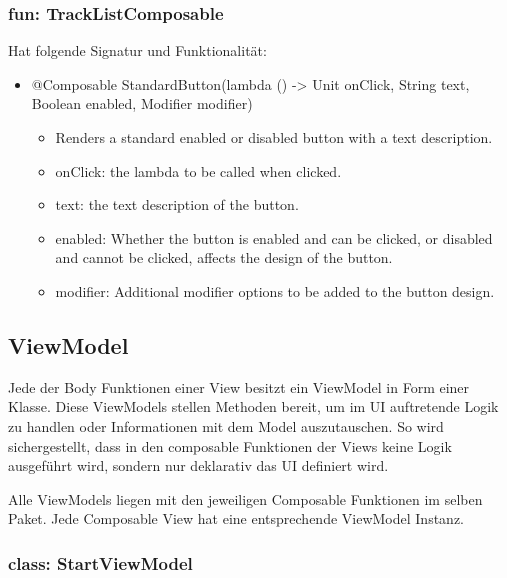 \documentclass[oneside, ngerman]{sdqtechreport}
\begin{document}
\subsubsection{fun: TrackListComposable}

Hat folgende Signatur und Funktionalität:
\begin{itemize}
    \item @Composable StandardButton(lambda () -> Unit onClick, String text, Boolean enabled, Modifier modifier)
    \begin{itemize}
        \item Renders a standard enabled or disabled button with a text description.
        \item onClick: the lambda to be called when clicked.
        \item text: the text description of the button.
        \item enabled: Whether the button is enabled and can be clicked, or disabled and cannot be clicked, affects the design of the button.
        \item modifier: Additional modifier options to be added to the button design.
    \end{itemize}
\end{itemize}




\subsection{ViewModel}
\label{sec:App:ViewModel}

Jede der Body Funktionen einer View besitzt ein ViewModel in Form einer Klasse. Diese ViewModels stellen Methoden bereit, um im UI auftretende Logik zu handlen oder Informationen mit dem Model auszutauschen. So wird sichergestellt, dass in den composable Funktionen der Views keine Logik ausgeführt wird, sondern nur deklarativ das UI definiert wird.

Alle ViewModels liegen mit den jeweiligen Composable Funktionen im selben Paket.
Jede Composable View hat eine entsprechende ViewModel Instanz.



\subsubsection{class: StartViewModel}
\end{document}
